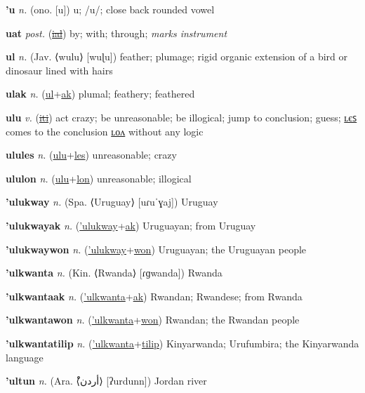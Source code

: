 \textbf{\hypertarget{'u}{'u}} \textit{n.} (ono. [u])
u; /u/; close back rounded vowel

\textbf{\hypertarget{uat}{uat}} \textit{post.} (\hyperlink{ial}{\sout{ial}})
by; with; through; \textit{marks instrument}

\textbf{\hypertarget{ul}{ul}} \textit{n.} (Jav. ⟨wulu⟩ [wuɭu])
feather; plumage; rigid organic extension of a bird or dinosaur lined with hairs

\textbf{\hypertarget{ulak}{ulak}} \textit{n.} (\hyperlink{ul}{ul}+\allowbreak \hyperlink{ak}{ak})
plumal; feathery; feathered

\textbf{\hypertarget{ulu}{ulu}} \textit{v.} (\hyperlink{iti}{\sout{iti}})
act crazy; be unreasonable; be illogical; jump to conclusion; guess; \hyperlink{ulules}{ʟєꜱ} comes to the conclusion \hyperlink{ululon}{ʟᴏᴧ} without any logic

\textbf{\hypertarget{ulules}{ulules}} \textit{n.} (\hyperlink{ulu}{ulu}+\allowbreak \hyperlink{les}{les})
unreasonable; crazy

\textbf{\hypertarget{ululon}{ululon}} \textit{n.} (\hyperlink{ulu}{ulu}+\allowbreak \hyperlink{lon}{lon})
unreasonable; illogical

\textbf{\hypertarget{'ulukway}{'ulukway}} \textit{n.} (Spa. ⟨Uruguay⟩ [uɾuˈɣaj])
Uruguay

\textbf{\hypertarget{'ulukwayak}{'ulukwayak}} \textit{n.} (\hyperlink{'ulukway}{'ulukway}+\allowbreak \hyperlink{ak}{ak})
Uruguayan; from Uruguay

\textbf{\hypertarget{'ulukwaywon}{'ulukwaywon}} \textit{n.} (\hyperlink{'ulukway}{'ulukway}+\allowbreak \hyperlink{won}{won})
Uruguayan; the Uruguayan people

\textbf{\hypertarget{'ulkwanta}{'ulkwanta}} \textit{n.} (Kin. ⟨Rwanda⟩ [ɾɡwanda])
Rwanda

\textbf{\hypertarget{'ulkwantaak}{'ulkwantaak}} \textit{n.} (\hyperlink{'ulkwanta}{'ulkwanta}+\allowbreak \hyperlink{ak}{ak})
Rwandan; Rwandese; from Rwanda

\textbf{\hypertarget{'ulkwantawon}{'ulkwantawon}} \textit{n.} (\hyperlink{'ulkwanta}{'ulkwanta}+\allowbreak \hyperlink{won}{won})
Rwandan; the Rwandan people

\textbf{\hypertarget{'ulkwantatilip}{'ulkwantatilip}} \textit{n.} (\hyperlink{'ulkwanta}{'ulkwanta}+\allowbreak \hyperlink{tilip}{tilip})
Kinyarwanda; Urufumbira; the Kinyarwanda language

\textbf{\hypertarget{'ultun}{'ultun}} \textit{n.} (Ara. ⟨{\arabics{}ْأردن}⟩ [ʔurdunn])
Jordan river


